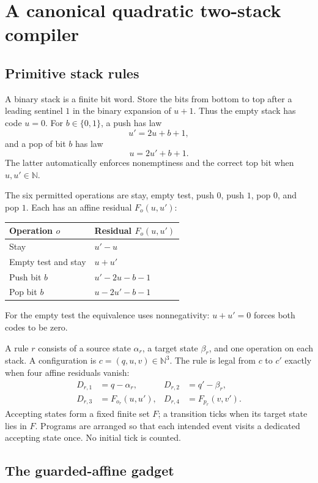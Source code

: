 \documentclass[11pt,letterpaper]{article}
\theoremstyle{definition}
\theoremstyle{remark}
\newcommand{\N}{\mathbb N}
\newcommand{\B}{\{0,1\}}
\newcommand{\1}{\mathbf 1}
\newcommand{\srctag}[1]{\texorpdfstring{\hspace{0.4em}{\normalfont\small\color{accent}[source #1]}}{ [source #1]}}
\begin{document}
\section{A canonical quadratic two-stack compiler\srctag{12}}\label{lbh:cs:sec:quadratic}

\subsection{Primitive stack rules}
A binary stack is a finite bit word. Store the bits from bottom to top
after a leading sentinel $1$ in the binary expansion of $u+1$. Thus the
empty stack has code $u=0$. For $b\in\B$, a push has law
\[
 u'=2u+b+1,
\]
and a pop of bit $b$ has law
\[
 u=2u'+b+1.
\]
The latter automatically enforces nonemptiness and the correct top bit
when $u,u'\in\N$.

The six permitted operations are stay, empty test, push $0$, push $1$,
pop $0$, and pop $1$. Each has an affine residual $F_o(u,u')$:
\begin{center}
\begin{tabular}{@{}ll@{}}
\toprule
Operation $o$ & Residual $F_o(u,u')$\\
\midrule
Stay & $u'-u$\\
Empty test and stay & $u+u'$\\
Push bit $b$ & $u'-2u-b-1$\\
Pop bit $b$ & $u-2u'-b-1$\\
\bottomrule
\end{tabular}
\end{center}
For the empty test the equivalence uses nonnegativity: $u+u'=0$ forces
both codes to be zero.

A rule $r$ consists of a source state $\alpha_r$, a target state
$\beta_r$, and one operation on each stack. A configuration is
$c=(q,u,v)\in\N^3$. The rule is legal from $c$ to $c'$ exactly when four
affine residuals vanish:
\begin{align}
 D_{r,1}&=q-\alpha_r,&D_{r,2}&=q'-\beta_r,\label{lbh:cs:eq:res-state}\\
 D_{r,3}&=F_{o_r}(u,u'),&D_{r,4}&=F_{p_r}(v,v').\label{lbh:cs:eq:res-stack}
\end{align}
Accepting states form a fixed finite set $F$; a transition ticks when its
target state lies in $F$. Programs are arranged so that each intended
event visits a dedicated accepting state once. No initial tick is counted.

\subsection{The guarded-affine gadget}
\end{document}
